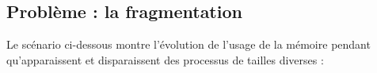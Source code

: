 \begin{multicols}{2}






\subsection{Problème : la fragmentation}


Le scénario ci-dessous montre l'évolution de l'usage de la mémoire 
pendant qu'apparaissent et disparaissent des processus de tailles
diverses :
 

\end{multicols}
